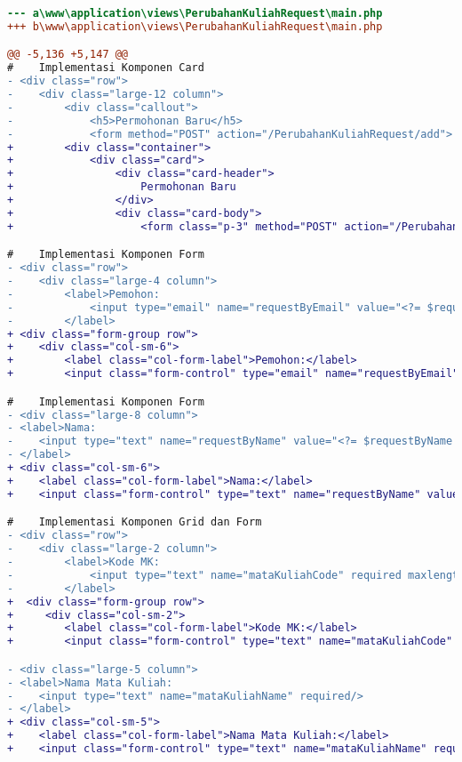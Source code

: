 \begin{lstlisting}[language=diff, caption=Perubahan file \path{\views\PerubahanKuliahRequest\main.php} ,  basicstyle=\ttfamily, frame=single,
columns=fullflexible, keepspaces=true, breaklines=true, label={lst:mainPerubahanKuliahRequest}]
--- a\www\application\views\PerubahanKuliahRequest\main.php
+++ b\www\application\views\PerubahanKuliahRequest\main.php

@@ -5,136 +5,147 @@
#    Implementasi Komponen Card
- <div class="row">
-    <div class="large-12 column">
-        <div class="callout">
-            <h5>Permohonan Baru</h5>
-            <form method="POST" action="/PerubahanKuliahRequest/add">
+        <div class="container">
+            <div class="card">
+                <div class="card-header">
+                    Permohonan Baru
+                </div>
+                <div class="card-body">
+                    <form class="p-3" method="POST" action="/PerubahanKuliahRequest/add">

#    Implementasi Komponen Form
- <div class="row">
-    <div class="large-4 column">
-        <label>Pemohon:
-            <input type="email" name="requestByEmail" value="<?= $requestByEmail ?>" readonly="readonly"/>
-        </label>
+ <div class="form-group row">
+    <div class="col-sm-6">
+        <label class="col-form-label">Pemohon:</label>
+        <input class="form-control" type="email" name="requestByEmail" value="<?= $requestByEmail ?>" 

#    Implementasi Komponen Form
- <div class="large-8 column">
- <label>Nama:
-    <input type="text" name="requestByName" value="<?= $requestByName ?>" readonly="readonly"/>
- </label>
+ <div class="col-sm-6">
+    <label class="col-form-label">Nama:</label>
+    <input class="form-control" type="text" name="requestByName" value="<?= $requestByName ?>" readonly="readonly"/>

#    Implementasi Komponen Grid dan Form
- <div class="row">
-    <div class="large-2 column">
-        <label>Kode MK:
-            <input type="text" name="mataKuliahCode" required maxlength="9" pattern="[A-Z]{3}[0-9]{3}([0-9]{3})?" title="Kode MK dalam format XYZ123"/>
-        </label>
+  <div class="form-group row">
+     <div class="col-sm-2">
+        <label class="col-form-label">Kode MK:</label>
+        <input class="form-control" type="text" name="mataKuliahCode" required maxlength="9" pattern="[A-Z]{3}[0-9]{3}([0-9]{3})?" title="Kode MK dalam format XYZ123"/>

- <div class="large-5 column">
- <label>Nama Mata Kuliah:
-    <input type="text" name="mataKuliahName" required/>
- </label>
+ <div class="col-sm-5">
+    <label class="col-form-label">Nama Mata Kuliah:</label>
+    <input class="form-control" type="text" name="mataKuliahName" required/>


\end{lstlisting}
